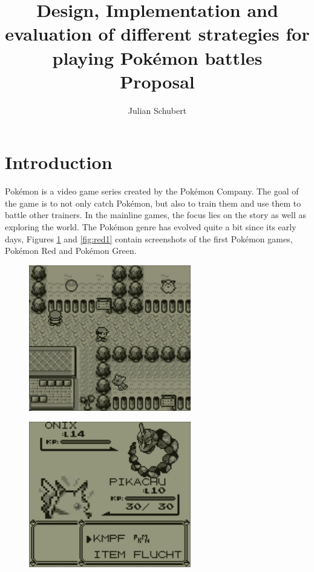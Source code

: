 \documentclass{article}
\title{Design, Implementation and evaluation of different strategies for playing Pokémon battles \\ Proposal}
\author{Julian Schubert}
\begin{document}
\maketitle

\section{Introduction}
Pokémon is a video game series created by the Pokémon Company.
The goal of the game is to not only catch Pokémon, but also to train them and use
them to battle other trainers. In the mainline games, the focus lies on the story
as well as exploring the world. The Pokémon genre has evolved quite a bit since
its early days, Figures \ref{fig:red0} and \ref{fig:red1} contain screenshots 
of the first Pokémon games, Pokémon Red and Pokémon Green.
\begin{figure}[ht]
    \centering
    \begin{minipage}{.5\textwidth}
      \centering
      \includegraphics[width=.9\linewidth]{images/Red-0.jpg}
      \label{fig:red0}
    \end{minipage}%
    \begin{minipage}{.5\textwidth}
      \centering
      \includegraphics[width=.9\linewidth]{images/Red-1.jpg}

\end{minipage}
\end{figure}
\end{document}
